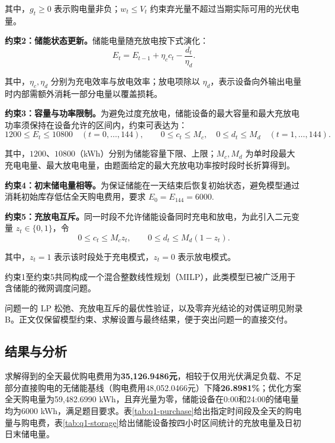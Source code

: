 其中，$g_t\ge0$ 表示购电量非负；$w_t\le V_t$ 约束弃光量不超过当期实际可用的光伏电量。

\textbf{约束2：储能状态更新。}储能电量随充放电按下式演化：
\begin{equation}
E_t=E_{t-1}+\eta_c c_t-\frac{d_t}{\eta_d}.
\end{equation}

其中，$\eta_c,\eta_d$ 分别为充电效率与放电效率；放电项除以 $\eta_d$，表示设备向外输出电量时内部需额外消耗一部分电量以覆盖损耗。

\textbf{约束3：容量与功率限制。}为避免过度充放电，储能设备的最大容量和最大充放电功率须保持在设备允许的区间内，约束可表达为：
\begin{equation}
1200\le E_t\le10800\quad(t=0,\ldots,144),\qquad 0\le c_t\le M_c,\quad 0\le d_t\le M_d\quad(t=1,\ldots,144).
\end{equation}

其中，$1200$、$10800$（kWh）分别为储能容量下限、上限；$M_c,M_d$ 为单时段最大充电电量、最大放电电量，由题面给定的最大充放电功率按时段时长折算得到。

\textbf{约束4：初末储电量相等。}为保证储能在一天结束后恢复初始状态，避免模型通过消耗初始库存低估全天购电费用，要求
$E_0=E_{144}=6000$.


\textbf{约束5：充放电互斥。}同一时段不允许储能设备同时充电和放电，为此引入二元变量 $z_t\in\{0,1\}$，令
\begin{equation}
0\le c_t\le M_cz_t,\qquad 0\le d_t\le M_d(1-z_t).
\end{equation}

其中，$z_t=1$ 表示该时段处于充电模式，$z_t=0$ 表示放电模式。

约束1至约束5共同构成一个混合整数线性规划（MILP），此类模型已被广泛用于含储能的微网调度问题\cite{ref_milp_microgrid}。

问题一的 LP 松弛、充放电互斥的最优性验证，以及零弃光结论的对偶证明见附录 B。正文仅保留模型约束、求解设置与最终结果，便于突出问题一的直接交付。

\subsection{结果与分析}
求解得到的全天最优购电费用为\textbf{35{,}126.9486元}，相较于仅用光伏满足负载、不足部分直接购电的无储能基线（购电费用48{,}052.0466元）下降\textbf{26.8981\%}；优化方案全天购电量为59{,}482.6990 kWh，且弃光量为零，储能设备在0:00和24:00的储电量均为6000 kWh，满足题目要求。表\ref{tab:q1-purchase}给出指定时间段及全天的购电量与购电费，表\ref{tab:q1-storage}给出储能设备按四小时区间统计的充放电量及日初日末储电量。

